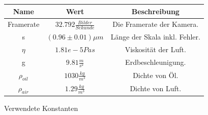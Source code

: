 \documentclass{scrartcl}
\begin{document}
                    \begin{figure}[H]
                        \centering
                        \begin{tabular}{c|c|c}
                            \hline
                            Name & Wert & Beschreibung \\
                            \hline
                            Framerate & $32.792 \frac{Bilder}{Sekunde}$ & Die Framerate der Kamera.\\ 
                            s & $(0.96\pm 0.01) \mu m$ & Länge der Skala inkl. Fehler.\\
                            $\eta$ & $1.81e-5 Pas$ & Viskosität der Luft.\\
                            g & $9.81 \frac{m}{s^2}$ & Erdbeschleunigung.\\
                            $\rho_{oil}$ & $1030 \frac{kg}{m^3}$ & Dichte von Öl.\\
                            $\rho_{air}$ & $1.29 \frac{kg}{m^3}$ & Dichte von Luft.\\
                        \end{tabular}
                        \caption{Verwendete Konstanten}
                        \label{Konstanten}
                    \end{figure}
\end{document}
